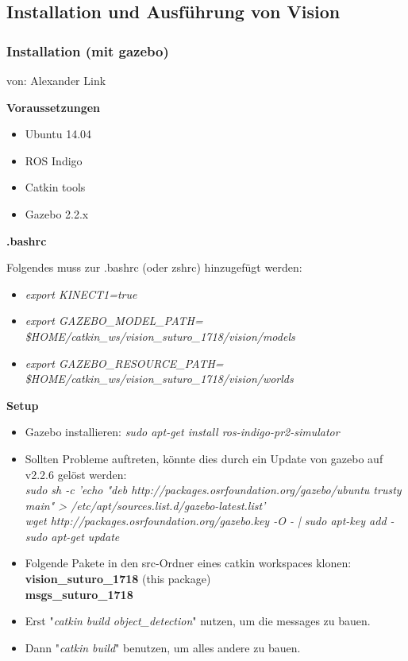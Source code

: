 \documentclass{suturo}
\makeatletter
\newcommand{\chapterauthor}[1]{%
  {\parindent0pt\vspace*{-27pt}%
  \linespread{0}\small\begin{flushright}von: #1\end{flushright}%
  \par\nobreak\vspace*{0pt}}
  \@afterheading%
}
\makeatother
\begin{document}
\subsection{Installation und Ausführung von Vision}

\subsubsection{Installation (mit gazebo)}
\chapterauthor{Alexander Link}

\textbf{Voraussetzungen}

\begin{itemize}
\item Ubuntu 14.04
\item ROS Indigo
\item Catkin tools
\item Gazebo 2.2.x
\end{itemize}

\textbf{.bashrc}

Folgendes muss zur .bashrc (oder zshrc) hinzugefügt werden:
\begin{itemize}
\item \textit{export KINECT1=true}
\item \textit{export GAZEBO\_MODEL\_PATH= \$HOME/catkin\_ws/vision\_suturo\_1718/vision/models}
\item \textit{export GAZEBO\_RESOURCE\_PATH= \$HOME/catkin\_ws/vision\_suturo\_1718/vision/worlds}
\end{itemize}

\textbf{Setup}

\begin{itemize}
\item Gazebo installieren: \textit{sudo apt-get install ros-indigo-pr2-simulator}

\item Sollten Probleme auftreten, könnte dies durch ein Update von gazebo auf v2.2.6 gelöst werden:
\\
\textit{sudo sh -c 'echo "deb http://packages.osrfoundation.org/gazebo/ubuntu trusty main" > /etc/apt/sources.list.d/gazebo-latest.list'}
\\
\textit{wget http://packages.osrfoundation.org/gazebo.key -O - | sudo apt-key add -}
\\
\textit{sudo apt-get update}

\item Folgende Pakete in den src-Ordner eines catkin workspaces klonen:\\
        \textbf{vision\_suturo\_1718} (this package) \\
        \textbf{msgs\_suturo\_1718}
\item Erst "\textit{catkin build object\_detection}" nutzen, um die messages zu bauen.
\item Dann "\textit{catkin build}" benutzen, um alles andere zu bauen.

\end{itemize}
\end{document}
